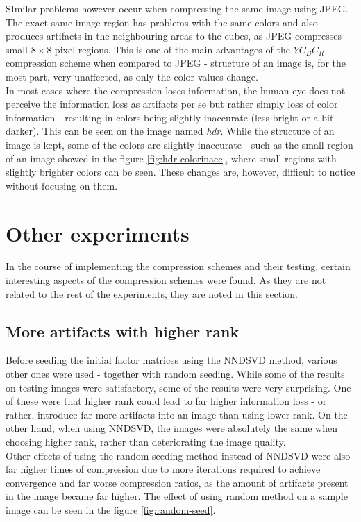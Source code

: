 \documentclass[thesis=M,english]{FITthesis}[2012/10/20]
\begin{document}
SImilar problems however occur when compressing the same image using JPEG.
The exact same image region has problems with the same colors and also produces artifacts in the
neighbouring areas to the cubes, as JPEG compresses small $8 \times 8$ pixel regions.
This is one of the main advantages of the $YC_BC_R$ compression scheme when
compared to JPEG - structure of an image is, for the most part, very unaffected,
as only the color values change.
\\

In most cases where the compression loses information, the human eye does not perceive
the information loss as artifacts per se but rather simply loss of color information - resulting
in colors being slightly inaccurate (less bright or a bit darker). This can be seen on the
image named \emph{hdr}. While the structure of an image is kept, some of the colors are slightly
inaccurate - such as the small region of an image showed in the figure \ref{fig:hdr-colorinacc},
where small regions with slightly brighter colors can be seen. These changes are, however, difficult
to notice without focusing on them.


\section{Other experiments}
In the course of implementing the compression schemes and their testing, certain
interesting aspects of the compression schemes were found. As they are not
related to the rest of the experiments, they are noted in this section.


\subsection{More artifacts with higher rank}
Before seeding the initial factor matrices using the NNDSVD method, various other
ones were used - together with random seeding. While some of the results on testing
images were satisfactory, some of the results were very surprising. One of these were
that higher rank could lead to far higher information loss - or rather, introduce far more
artifacts into an image than using lower rank. On the other hand, when using NNDSVD,
the images were absolutely the same when choosing higher rank, rather than deteriorating
the image quality.
\\

Other effects of using the random seeding method instead of NNDSVD were also far higher
times of compression due to more iterations required to achieve convergence and far worse
compression ratios, as the amount of artifacts present in the image became far higher. The
effect of using random method on a sample image can be seen in the figure \ref{fig:random-seed}.
\end{document}
